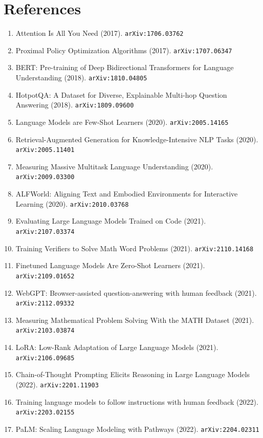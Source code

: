 \documentclass[11pt]{article}
\begin{document}
\section*{References}
\begin{enumerate}\small
  \item Attention Is All You Need (2017). \texttt{arXiv:1706.03762}
  \item Proximal Policy Optimization Algorithms (2017). \texttt{arXiv:1707.06347}
  \item BERT: Pre-training of Deep Bidirectional Transformers for Language
  Understanding (2018). \texttt{arXiv:1810.04805}
  \item HotpotQA: A Dataset for Diverse, Explainable Multi-hop Question
  Answering (2018). \texttt{arXiv:1809.09600}
  \item Language Models are Few-Shot Learners (2020). \texttt{arXiv:2005.14165}
  \item Retrieval-Augmented Generation for Knowledge-Intensive NLP Tasks (2020). \texttt{arXiv:2005.11401}
  \item Measuring Massive Multitask Language Understanding (2020). \texttt{arXiv:2009.03300}
  \item ALFWorld: Aligning Text and Embodied Environments for Interactive
  Learning (2020). \texttt{arXiv:2010.03768}
  \item Evaluating Large Language Models Trained on Code (2021). \texttt{arXiv:2107.03374}
  \item Training Verifiers to Solve Math Word Problems (2021). \texttt{arXiv:2110.14168}
  \item Finetuned Language Models Are Zero-Shot Learners (2021). \texttt{arXiv:2109.01652}
  \item WebGPT: Browser-assisted question-answering with human feedback (2021). \texttt{arXiv:2112.09332}
  \item Measuring Mathematical Problem Solving With the MATH Dataset (2021). \texttt{arXiv:2103.03874}
  \item LoRA: Low-Rank Adaptation of Large Language Models (2021). \texttt{arXiv:2106.09685}
  \item Chain-of-Thought Prompting Elicits Reasoning in Large Language Models (2022). \texttt{arXiv:2201.11903}
  \item Training language models to follow instructions with human feedback (2022). \texttt{arXiv:2203.02155}
  \item PaLM: Scaling Language Modeling with Pathways (2022). \texttt{arXiv:2204.02311}

\end{enumerate}
\end{document}
